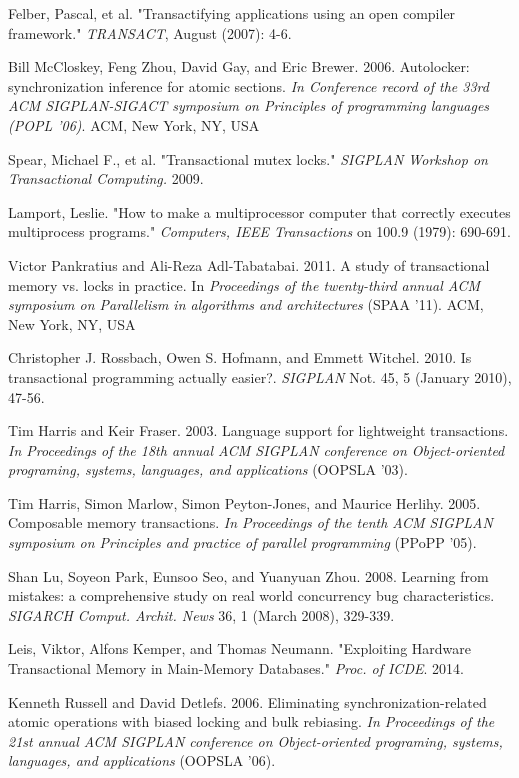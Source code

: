 \documentclass{sigplanconf}
\begin{document}
\begin{thebibliography}{}
  Felber, Pascal, et al. "Transactifying applications using an open
  compiler framework." \emph{TRANSACT}, August (2007): 4-6.

  Bill McCloskey, Feng Zhou, David Gay, and Eric
  Brewer. 2006. Autolocker: synchronization inference for atomic
  sections. \emph{In Conference record of the 33rd ACM SIGPLAN-SIGACT
  symposium on Principles of programming languages (POPL '06)}. ACM,
  New York, NY, USA

  Spear, Michael F., et al. "Transactional mutex locks." \emph{SIGPLAN
    Workshop on Transactional Computing.} 2009.

  Lamport, Leslie. "How to make a multiprocessor computer that
  correctly executes multiprocess programs." \emph{Computers, IEEE
    Transactions} on 100.9 (1979): 690-691.

  Victor Pankratius and Ali-Reza Adl-Tabatabai. 2011. A study of
  transactional memory vs. locks in practice. In \emph{Proceedings of
    the twenty-third annual ACM symposium on Parallelism in algorithms
    and architectures} (SPAA '11). ACM, New York, NY, USA

  Christopher J. Rossbach, Owen S. Hofmann, and Emmett
  Witchel. 2010. Is transactional programming actually
  easier?. \emph{SIGPLAN} Not. 45, 5 (January 2010), 47-56.

  Tim Harris and Keir Fraser. 2003. Language support for lightweight
  transactions. \emph{In Proceedings of the 18th annual ACM SIGPLAN
    conference on Object-oriented programing, systems, languages, and
    applications} (OOPSLA '03).

  Tim Harris, Simon Marlow, Simon Peyton-Jones, and Maurice
  Herlihy. 2005. Composable memory transactions. \emph{In Proceedings
    of the tenth ACM SIGPLAN symposium on Principles and practice of
    parallel programming} (PPoPP '05).

  Shan Lu, Soyeon Park, Eunsoo Seo, and Yuanyuan Zhou. 2008. Learning
  from mistakes: a comprehensive study on real world concurrency bug
  characteristics. \emph{SIGARCH Comput. Archit. News} 36, 1 (March 2008),
  329-339.

  Leis, Viktor, Alfons Kemper, and Thomas Neumann. "Exploiting
  Hardware Transactional Memory in Main-Memory Databases."
  \emph{Proc. of ICDE}. 2014.

  Kenneth Russell and David Detlefs. 2006. Eliminating
  synchronization-related atomic operations with biased locking and
  bulk rebiasing. \emph{In Proceedings of the 21st annual ACM SIGPLAN
    conference on Object-oriented programing, systems, languages, and
    applications} (OOPSLA '06).

\end{thebibliography}
\end{document}
